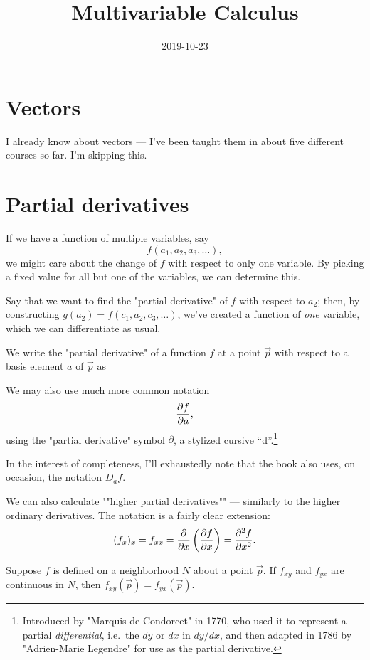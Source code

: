 \documentclass[knowledge]{mathnotes}
\title{Multivariable Calculus}
\date{2019-10-23}
\begin{document}
\maketitle
\tableofcontents

\chapter{Vectors}
I already know about vectors --- I've been taught them in about five
different courses so far. I'm skipping this.

\chapter{Partial derivatives}

If we have a function of multiple variables, say
\[f(a_1, a_2, a_3, \dots),\]
we might care about the change of $f$ with respect to only one variable. By
picking a fixed value for all but one of the variables, we can determine
this.

Say that we want to find the "partial derivative" of $f$ with respect to
$a_2$; then, by constructing $g(a_2) = f(c_1, a_2, c_3, \dots)$, we've
created a function of \emph{one} variable, which we can differentiate as
usual.
\begin{notation}
  We write the "partial derivative" of a function $f$ at a point $\vec p$ 
  with respect to a basis element $a$ of $\vec p$ as 

  We may also use much more common notation
  \[\pd[f]{a},\]
  using the "partial derivative" symbol $\partial$, a stylized cursive
  ``d''.\footnote{Introduced by "Marquis de Condorcet" in 1770, who used it
  to represent a partial \emph{differential}, i.e.~the $dy$ or $dx$ in
  $dy/dx$, and then adapted in 1786 by "Adrien-Marie Legendre" for use as the
  partial derivative.}

  In the interest of completeness, I'll exhaustedly note that the book also
  uses, on occasion, the notation $D_a f$.
\end{notation}

We can also calculate ""higher partial derivatives"" --- similarly to the
higher ordinary derivatives. The notation is a fairly clear extension:
\[(f_x)_x = f_{xx} = \pd x \left( \pd[f]{x} \right) = \pd[^2 f]{x^2}.\]

\begin{thm}
  Suppose $f$ is defined on a neighborhood $N$ about a point $\vec p$.
  If $f_{xy}$ and $f_{yx}$ are continuous in $N$, then $f_{xy}(\vec p) =
  f_{yx}(\vec p)$.
\end{thm}
\end{document}
